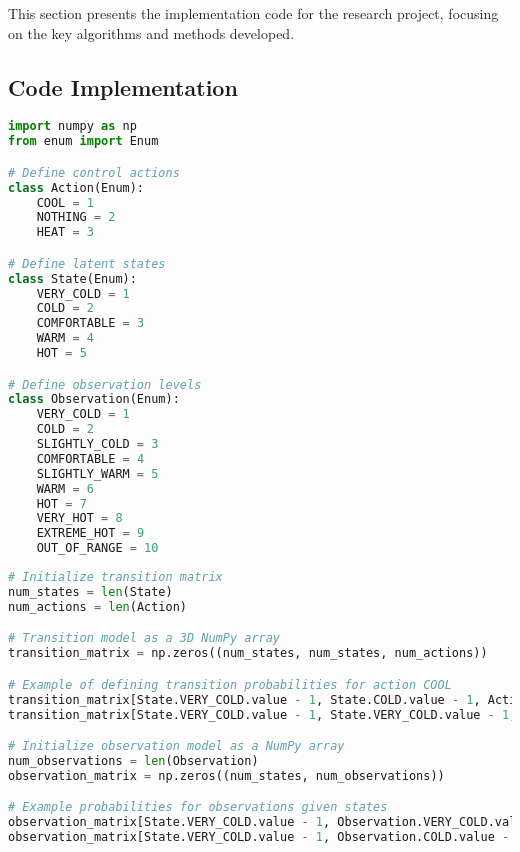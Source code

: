 \documentclass[11pt,a4paper]{article}
\begin{document}
This section presents the implementation code for the research project, focusing on the key algorithms and methods developed.

\subsection{Code Implementation}

\begin{lstlisting}[language=Python, caption={Implementation code for the POMDP with Active Inference}]
import numpy as np
from enum import Enum

# Define control actions
class Action(Enum):
    COOL = 1
    NOTHING = 2
    HEAT = 3

# Define latent states
class State(Enum):
    VERY_COLD = 1
    COLD = 2
    COMFORTABLE = 3
    WARM = 4
    HOT = 5

# Define observation levels
class Observation(Enum):
    VERY_COLD = 1
    COLD = 2
    SLIGHTLY_COLD = 3
    COMFORTABLE = 4
    SLIGHTLY_WARM = 5
    WARM = 6
    HOT = 7
    VERY_HOT = 8
    EXTREME_HOT = 9
    OUT_OF_RANGE = 10
\end{lstlisting}

\begin{lstlisting}[language=Python, caption={Implementation of transition model and observation model}]
# Initialize transition matrix
num_states = len(State)
num_actions = len(Action)

# Transition model as a 3D NumPy array
transition_matrix = np.zeros((num_states, num_states, num_actions))

# Example of defining transition probabilities for action COOL
transition_matrix[State.VERY_COLD.value - 1, State.COLD.value - 1, Action.COOL.value - 1] = 0.8
transition_matrix[State.VERY_COLD.value - 1, State.VERY_COLD.value - 1, Action.COOL.value - 1] = 0.2

# Initialize observation model as a NumPy array
num_observations = len(Observation)
observation_matrix = np.zeros((num_states, num_observations))

# Example probabilities for observations given states
observation_matrix[State.VERY_COLD.value - 1, Observation.VERY_COLD.value - 1] = 0.9
observation_matrix[State.VERY_COLD.value - 1, Observation.COLD.value - 1] = 0.1
\end{lstlisting}
\end{document}
